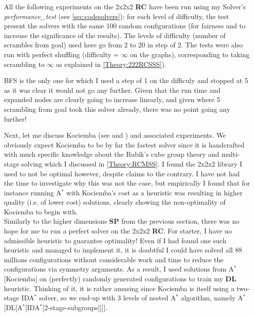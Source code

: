 All the following experiments on the 2x2x2 \textbf{RC} have been run using my Solver's \textit{performance\_test} (see \ref{sec:codesolvers}): for each level of difficulty, the test present the solvers with the same 100 random configurations (for fairness and to increase the significance of the results). The levels of difficulty (number of scrambles from goal) used here go from 2 to 20 in step of 2. The tests were also run with perfect shuffling (difficulty = $\infty$ on the graphs), corresponding to taking scrambling to $\infty$ as explained in \ref{Theory:222RCSSS}).

BFS is the only one for which I used a step of 1 on the difficuly and stopped at 5 as it was clear it would not go any further. Given that the run time and expanded nodes are clearly going to increase linearly, and given where 5 scrambling from goal took this solver already, there was no point going any further!

Next, let me discuss Kociemba (see \cite{HKociemba} and \cite{Kociemba}) and associated experiments. We obviously expect Kociemba to be by far the fastest solver since it is handcrafted with much specific knowledge about the Rubik's cube group theory and multi-stage solving which I discussed in \ref{Theory:RCMSS}. I found the 2x2x2 library I used to not be optimal however, despite claims to the contrary. I have not had the time to investigate why this was not the case, but empirically I found that for instance running A$^{*}$ with Kociemba's cost as a heuristic was resulting in higher quality (i.e. of lower cost) solutions, clearly showing the non-optimality of Kociemba to begin with.
\\
\noindent Similarly to the higher dimensions \textbf{SP} from the previous section, there was no hope for me to run a perfect solver on the 2x2x2 \textbf{RC}. For starter, I have no admissible heuristic to guarantee optimality! Even if I had found one such heuristic and managed to implement it, it is doubtful I could have solved all 88 millions configurations without considerable work and time to reduce the configurations via symmetry arguments. As a result, I used solutions from A$^{*}$[Kociemba] on (perfectly) randomly generated configurations to train my \textbf{DL} heuristic. Thinking of it, it is rather amusing since Kociemba is itself using a two-stage IDA$^{*}$ solver, so we end-up with 3 levels of nested A$^{*}$ algorithm, namely A$^{*}$[DL[A$^{*}$[IDA$^{*}$[2-stage-subgroups]]]].







